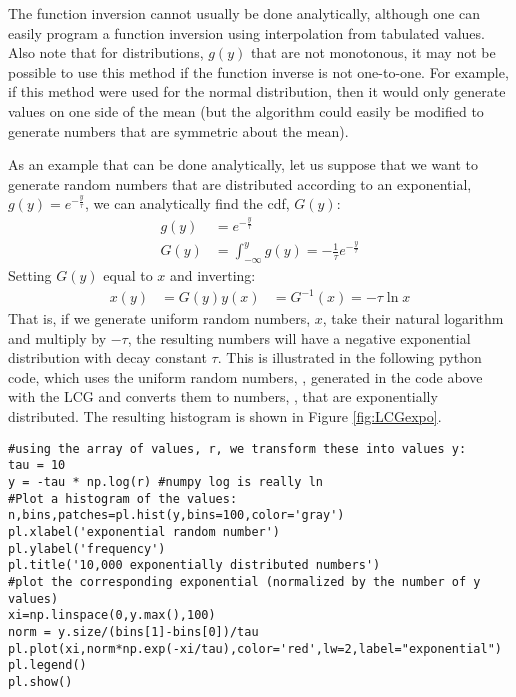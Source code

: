 The function inversion cannot usually be done analytically, although one can easily program a function inversion using interpolation from tabulated values. Also note that for distributions, $g(y)$ that are not monotonous, it may not be possible to use this method if the function inverse is not one-to-one. For example, if this method were used for the normal distribution, then it would only generate values on one side of the mean (but the algorithm could easily be modified to generate numbers that are symmetric about the mean).

As an example that can be done analytically, let us suppose that we want to generate random numbers that are distributed according to an exponential, $g(y) = e^{-\frac{y}{\tau}}$, we can analytically find the cdf, $G(y)$:
\begin{align*}
g(y) &= e^{-\frac{y}{\tau}}\nonumber\\
G(y) &= \int_{-\infty}^y g(y) = -\frac{1}{\tau} e^{-\frac{y}{\tau}}
\end{align*}
Setting $G(y)$ equal to $x$ and inverting:
\begin{align*}
x(y) &= G(y)
y(x) &= G^{-1}(x) = -\tau \ln{x} 
\end{align*}
That is, if we generate uniform random numbers, $x$, take their natural logarithm and multiply by $-\tau$, the resulting numbers will have a negative exponential distribution with decay constant $\tau$. This is illustrated in the following python code, which uses the uniform random numbers, , generated in the code above with the LCG and converts them to numbers, , that are exponentially distributed. The resulting histogram is shown in Figure \ref{fig:LCGexpo}.

\begin{lstlisting}[frame=single] 
#using the array of values, r, we transform these into values y:
tau = 10
y = -tau * np.log(r) #numpy log is really ln
#Plot a histogram of the values:
n,bins,patches=pl.hist(y,bins=100,color='gray')
pl.xlabel('exponential random number')
pl.ylabel('frequency')
pl.title('10,000 exponentially distributed numbers')
#plot the corresponding exponential (normalized by the number of y values)
xi=np.linspace(0,y.max(),100)
norm = y.size/(bins[1]-bins[0])/tau
pl.plot(xi,norm*np.exp(-xi/tau),color='red',lw=2,label="exponential")
pl.legend()
pl.show()
\end{lstlisting}


